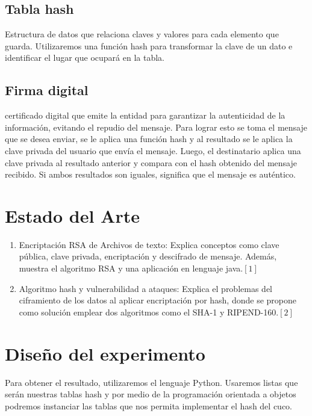 \documentclass[final,a4paper,twocolumn,romanappendices]{IEEEtran}
\begin{document}
\subsection{Tabla hash}
Estructura de datos que relaciona claves y valores para cada elemento que guarda. Utilizaremos una función hash para transformar la clave de un dato e identificar el lugar que ocupará en la tabla.

\subsection{Firma digital}
certificado digital que emite la entidad para garantizar la autenticidad de la información, evitando el repudio del mensaje. Para lograr esto se toma el mensaje que se desea enviar, se le aplica una función hash y al resultado se le aplica la clave privada del usuario que envía el mensaje. Luego, el destinatario aplica una clave privada al resultado anterior y compara con el hash obtenido del mensaje recibido. Si ambos resultados son iguales, significa que el mensaje es auténtico.\\

\section{Estado del Arte}

\begin{enumerate}

\item
Encriptación RSA de Archivos de texto: Explica conceptos como clave pública, clave privada, encriptación y descifrado de mensaje. Además, muestra el algoritmo RSA y una aplicación en lenguaje java.$[1]$

\item
Algoritmo hash y vulnerabilidad a ataques: Explica el problemas del ciframiento de los datos al aplicar encriptación por hash, donde se propone como solución emplear dos algoritmos como el SHA-1 y RIPEND-160.$[2]$
\end{enumerate}


\section{Diseño del experimento}
Para obtener el resultado, utilizaremos el lenguaje Python.
Usaremos listas que serán nuestras tablas hash y por medio de la programación orientada a objetos podremos instanciar las tablas que nos permita implementar el hash del cuco.
\end{document}
